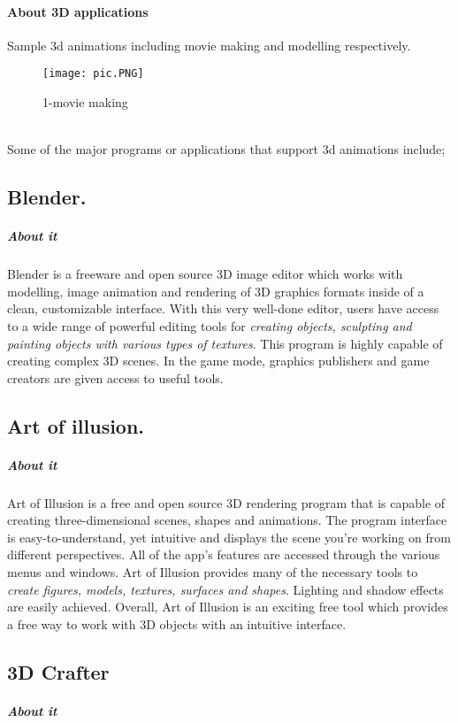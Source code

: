 \documentclass[12pt,a4paper]{article}
\begin{document}
\paragraph*{About 3D applications}
Sample 3d animations including movie making and modelling respectively.
\begin{figure}[h!]
\texttt{[image: pic.PNG]}
\caption{1-movie making}
\end{figure}
\\
Some of the major programs or applications that support 3d animations include;
\\
\begin{flushleft}
\subsection{Blender.}
\subparagraph*{About it}
\end{flushleft}
Blender is a freeware and open source 3D image editor which works with modelling, image animation and rendering of 3D graphics formats inside of a clean, customizable interface. With this very well-done editor, users have access to a wide range of powerful editing tools for \textit{creating objects, sculpting and painting objects with various types of textures}. This program is highly capable of creating complex 3D scenes. In the game mode, graphics publishers and game creators are given access to useful tools.
\begin{flushleft}
\subsection{Art of illusion.}
\subparagraph*{About it}
\end{flushleft}
Art of Illusion is a free and open source 3D rendering program that is capable of creating three-dimensional scenes, shapes and animations. The program interface is easy-to-understand, yet intuitive and displays the scene you're working on from different perspectives. All of the app's features are accessed through the various menus and windows. Art of Illusion provides many of the necessary tools to\textit{ create figures, models, textures, surfaces and shapes}. Lighting and shadow effects are easily achieved. Overall, Art of Illusion is an exciting free tool which provides a free way to work with 3D objects with an intuitive interface.
\begin{flushleft}
\subsection{3D Crafter}
\subparagraph*{About it}
\end{flushleft}
\end{document}
